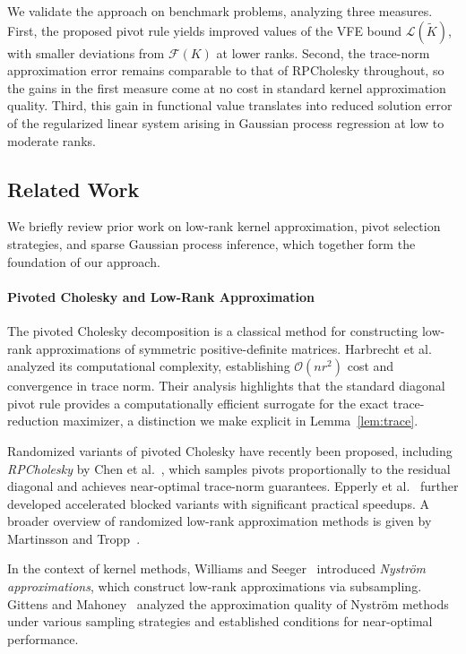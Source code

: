 \documentclass[onefignum,onetabnum]{siamart250211}
\begin{document}
We validate the approach on benchmark problems, analyzing three measures. First, the proposed pivot rule yields improved values of the VFE bound $\mathcal{L}(\widetilde{K})$, with smaller deviations from $\mathcal{F}(K)$ at lower ranks. Second, the trace-norm approximation error remains comparable to that of RPCholesky throughout, so the gains in the first measure come at no cost in standard kernel approximation quality. Third, this gain in functional value translates into reduced solution error of the regularized linear system arising in Gaussian process regression at low to moderate ranks. 

\subsection{Related Work}\label{subsec:previousWork}

We briefly review prior work on low-rank kernel approximation, pivot selection strategies, and sparse Gaussian process inference, which together form the foundation of our approach.

\paragraph{Pivoted Cholesky and Low-Rank Approximation}
The pivoted Cholesky decomposition is a classical method for constructing low-rank approximations of symmetric positive-definite matrices. Harbrecht et al.~\cite{harbrecht.2012} analyzed its computational complexity, establishing $\mathcal{O}(nr^2)$ cost and convergence in trace norm. Their analysis highlights that the standard diagonal pivot rule provides a computationally efficient surrogate for the exact trace-reduction maximizer, a distinction we make explicit in Lemma~\ref{lem:trace}. 

Randomized variants of pivoted Cholesky have recently been proposed, including \emph{RPCholesky} by Chen et al.~\cite{chen.2025}, which samples pivots proportionally to the residual diagonal and achieves near-optimal trace-norm guarantees. Epperly et al.~\cite{epperly.2025} further developed accelerated blocked variants with significant practical speedups. A broader overview of randomized low-rank approximation methods is given by Martinsson and Tropp~\cite{martinsson.2020}. 

In the context of kernel methods, Williams and Seeger~\cite{williams.2000} introduced \emph{Nystr\"om approximations}, which construct low-rank approximations via subsampling. Gittens and Mahoney~\cite{gittens.2013} analyzed the approximation quality of Nystr\"om methods under various sampling strategies and established conditions for near-optimal performance. 
\end{document}

